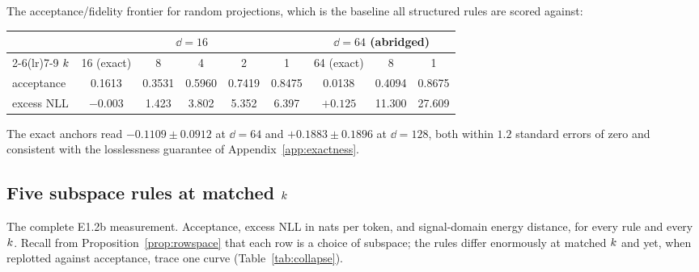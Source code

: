 The acceptance/fidelity frontier for random projections, which is the baseline all structured rules
are scored against:

\begin{center}
\small
\begin{tabular}{lcccccccc}
\toprule
& \multicolumn{5}{c}{$\dd = 16$} & \multicolumn{3}{c}{$\dd = 64$ (abridged)} \\
\cmidrule(lr){2-6}\cmidrule(lr){7-9}
$k$ & 16 (exact) & 8 & 4 & 2 & 1 & 64 (exact) & 8 & 1 \\
\midrule
acceptance & 0.1613 & 0.3531 & 0.5960 & 0.7419 & 0.8475 & 0.0138 & 0.4094 & 0.8675 \\
excess NLL & $-0.003$ & 1.423 & 3.802 & 5.352 & 6.397 & $+0.125$ & 11.300 & 27.609 \\
\bottomrule
\end{tabular}
\end{center}

The exact anchors read $-0.1109 \pm 0.0912$ at $\dd{=}64$ and $+0.1883 \pm 0.1896$ at $\dd{=}128$, both
within $1.2$ standard errors of zero and consistent with the losslessness guarantee of
Appendix~\ref{app:exactness}.

\subsection{Five subspace rules at matched $k$}

The complete E1.2b measurement. Acceptance, excess NLL in nats per token, and signal-domain energy
distance, for every rule and every $k$. Recall from Proposition~\ref{prop:rowspace} that each row is
a choice of subspace; the rules differ enormously at matched $k$ and yet, when replotted against
acceptance, trace one curve (Table~\ref{tab:collapse}).

